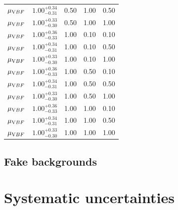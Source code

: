 \begin{table}
\begin{tabular}{l c c c c}
$\mu_{\text VBF}$&  $1.00^{+0.34}_{-0.31}$ & 0.50 & 1.00 & 0.50 \\ 
$\mu_{\text VBF}$&  $1.00^{+0.33}_{-0.30}$ & 0.50 & 1.00 & 1.00 \\ 
$\mu_{\text VBF}$&  $1.00^{+0.36}_{-0.33}$ & 1.00 & 0.10 & 0.10 \\ 
$\mu_{\text VBF}$&  $1.00^{+0.34}_{-0.31}$ & 1.00 & 0.10 & 0.50 \\ 
$\mu_{\text VBF}$&  $1.00^{+0.33}_{-0.30}$ & 1.00 & 0.10 & 1.00 \\ 
$\mu_{\text VBF}$&  $1.00^{+0.36}_{-0.33}$ & 1.00 & 0.50 & 0.10 \\ 
$\mu_{\text VBF}$&  $1.00^{+0.34}_{-0.31}$ & 1.00 & 0.50 & 0.50 \\ 
$\mu_{\text VBF}$&  $1.00^{+0.33}_{-0.30}$ & 1.00 & 0.50 & 1.00 \\ 
$\mu_{\text VBF}$&  $1.00^{+0.36}_{-0.33}$ & 1.00 & 1.00 & 0.10 \\ 
$\mu_{\text VBF}$&  $1.00^{+0.34}_{-0.31}$ & 1.00 & 1.00 & 0.50 \\ 
$\mu_{\text VBF}$&  $1.00^{+0.33}_{-0.30}$ & 1.00 & 1.00 & 1.00 \\ 
\end{tabular}
\label{tab:ggFBias}
\end{table}

\subsection{Fake backgrounds}
\section{Systematic uncertainties}

